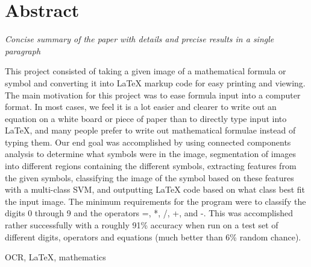 \section{Abstract}
\textit{Concise summary of the paper with details and precise results in a single paragraph
}

This project consisted of taking a given image of a mathematical formula or symbol and converting it into LaTeX markup code for easy printing and viewing.  The main motivation for this project was to ease formula input into a computer format.  In most cases, we feel it is a lot easier and clearer to write out an equation on a white board or piece of paper than to directly type input into LaTeX, and many people prefer to write out mathematical formulae instead of typing them.  Our end goal was accomplished by using connected components analysis to determine what symbols were in the image, segmentation of images into different regions containing the different symbols, extracting features from the given symbols, classifying the image of the symbol based on these features with a multi-class SVM, and outputting LaTeX code based on what class best fit the input image.  The minimum requirements for the program were to classify the digits 0 through 9 and the operators =, *, /, +, and -.  This was accomplished rather successfully with a roughly 91\% accuracy when run on a test set of different digits, operators and equations (much better than 6\% random chance).

\begin{keywords}
OCR, LaTeX, mathematics
\end{keywords}